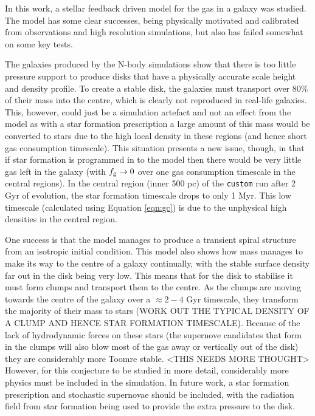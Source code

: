 In this work, a stellar feedback driven model for the gas in a galaxy was studied.
The model has some clear successes, being physically motivated and calibrated from observations and high resolution simulations, but also has failed somewhat on some key tests.

The galaxies produced by the N-body simulations show that there is too little pressure support to produce disks that have a physically accurate scale height and density profile.
To create a stable disk, the galaxies must transport over 80\% of their mass into the centre, which is clearly not reproduced in real-life galaxies.
This, however, could just be a simulation artefact and not an effect from the model as with a star formation prescription a large amount of this mass would be converted to stars due to the high local density in these regions (and hence short gas consumption timescale).
This situation presents a new issue, though, in that if star formation is programmed in to the model then there would be very little gas left in the galaxy (with $f_\mathrm{g} \rightarrow 0$ over one gas consumption timescale in the central regions).
In the central region (inner 500 pc) of the {\tt custom} run after 2 Gyr of evolution, the star formation timescale drops to only 1 Myr.
This low timescale (calculated using Equation \ref{eqn:gc}) is due to the unphysical high densities in the central region.

One success is that the model manages to produce a transient spiral structure from an isotropic initial condition.
This model also shows how mass manages to make its way to the centre of a galaxy continually, with the stable surface density far out in the disk being very low.
This means that for the disk to stabilise it must form clumps and transport them to the centre.
As the clumps are moving towards the centre of the galaxy over a $\approx 2-4$ Gyr timescale, they transform the majority of their mass to stars (WORK OUT THE TYPICAL DENSITY OF A CLUMP AND HENCE STAR FORMATION TIMESCALE).
Because of the lack of hydrodynamic forces on these stars (the supernove candidates that form in the clumps will also blow most of the gas away or vertically out of the disk) they are considerably more Toomre stable. <THIS NEEDS MORE THOUGHT>
However, for this conjecture to be studied in more detail, considerably more physics must be included in the simulation.
In future work, a star formation prescription and stochastic supernovae should be included, with the radiation field from star formation being used to provide the extra pressure to the disk.

